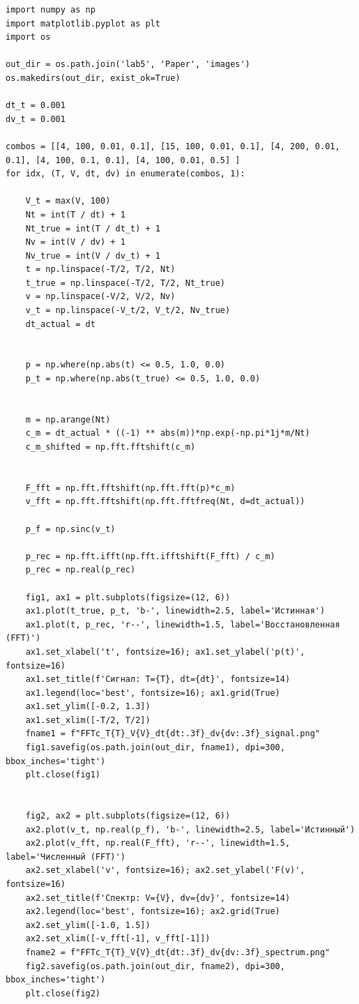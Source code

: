\documentclass[a4paper, 12pt]{article}
\begin{document}
\begin{lstlisting}[caption={Код для улучшенного дискретного преобразования Фурье в первом пункте}]
import numpy as np
import matplotlib.pyplot as plt
import os

out_dir = os.path.join('lab5', 'Paper', 'images')
os.makedirs(out_dir, exist_ok=True)

dt_t = 0.001
dv_t = 0.001

combos = [[4, 100, 0.01, 0.1], [15, 100, 0.01, 0.1], [4, 200, 0.01, 0.1], [4, 100, 0.1, 0.1], [4, 100, 0.01, 0.5] ]
for idx, (T, V, dt, dv) in enumerate(combos, 1):

    V_t = max(V, 100)
    Nt = int(T / dt) + 1
    Nt_true = int(T / dt_t) + 1
    Nv = int(V / dv) + 1
    Nv_true = int(V / dv_t) + 1
    t = np.linspace(-T/2, T/2, Nt)
    t_true = np.linspace(-T/2, T/2, Nt_true)
    v = np.linspace(-V/2, V/2, Nv)
    v_t = np.linspace(-V_t/2, V_t/2, Nv_true)
    dt_actual = dt 
    

    p = np.where(np.abs(t) <= 0.5, 1.0, 0.0)
    p_t = np.where(np.abs(t_true) <= 0.5, 1.0, 0.0)


    m = np.arange(Nt)
    c_m = dt_actual * ((-1) ** abs(m))*np.exp(-np.pi*1j*m/Nt)
    c_m_shifted = np.fft.fftshift(c_m)


    F_fft = np.fft.fftshift(np.fft.fft(p)*c_m)
    v_fft = np.fft.fftshift(np.fft.fftfreq(Nt, d=dt_actual))

    p_f = np.sinc(v_t) 

    p_rec = np.fft.ifft(np.fft.ifftshift(F_fft) / c_m)
    p_rec = np.real(p_rec)

    fig1, ax1 = plt.subplots(figsize=(12, 6))
    ax1.plot(t_true, p_t, 'b-', linewidth=2.5, label='Истинная')
    ax1.plot(t, p_rec, 'r--', linewidth=1.5, label='Восстановленная (FFT)')
    ax1.set_xlabel('t', fontsize=16); ax1.set_ylabel('p(t)', fontsize=16)
    ax1.set_title(f'Сигнал: T={T}, dt={dt}', fontsize=14)
    ax1.legend(loc='best', fontsize=16); ax1.grid(True)
    ax1.set_ylim([-0.2, 1.3])
    ax1.set_xlim([-T/2, T/2])
    fname1 = f"FFTc_T{T}_V{V}_dt{dt:.3f}_dv{dv:.3f}_signal.png"
    fig1.savefig(os.path.join(out_dir, fname1), dpi=300, bbox_inches='tight')
    plt.close(fig1)


    fig2, ax2 = plt.subplots(figsize=(12, 6))
    ax2.plot(v_t, np.real(p_f), 'b-', linewidth=2.5, label='Истинный')
    ax2.plot(v_fft, np.real(F_fft), 'r--', linewidth=1.5, label='Численный (FFT)')
    ax2.set_xlabel('v', fontsize=16); ax2.set_ylabel('F(v)', fontsize=16)
    ax2.set_title(f'Спектр: V={V}, dv={dv}', fontsize=14)
    ax2.legend(loc='best', fontsize=16); ax2.grid(True)
    ax2.set_ylim([-1.0, 1.5])
    ax2.set_xlim([-v_fft[-1], v_fft[-1]])
    fname2 = f"FFTc_T{T}_V{V}_dt{dt:.3f}_dv{dv:.3f}_spectrum.png"
    fig2.savefig(os.path.join(out_dir, fname2), dpi=300, bbox_inches='tight')
    plt.close(fig2)


\end{lstlisting}
\end{document}
